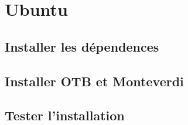 \documentclass[10pt,a4paper]{article}
\begin{document}
\clearpage
\section{Ubuntu}

\subsection{Installer les dépendences}

\subsection{Installer OTB et Monteverdi}

\subsection{Tester l'installation}
\end{document}
